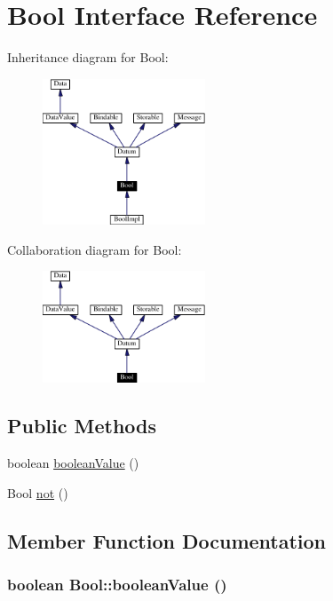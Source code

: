 \hypertarget{interfaceBool}{
\section{Bool  Interface Reference}
\label{interfaceBool}
}
Inheritance diagram for Bool:\begin{figure}[H]
\begin{center}
\leavevmode
\includegraphics[width=137pt]{interfaceBool__inherit__graph}
\end{center}
\end{figure}
Collaboration diagram for Bool:\begin{figure}[H]
\begin{center}
\leavevmode
\includegraphics[width=137pt]{interfaceBool__coll__graph}
\end{center}
\end{figure}
\subsection*{Public Methods}
\begin{CompactItemize}
\item 
boolean \hyperlink{interfaceBool_a0}{boolean\-Value} ()
\item 
Bool \hyperlink{interfaceBool_a1}{not} ()
\end{CompactItemize}


\subsection{Member Function Documentation}
\hypertarget{interfaceBool_a0}{
\subsubsection[booleanValue]{\setlength{\rightskip}{0pt plus 5cm}boolean Bool::boolean\-Value ()}}
\label{interfaceBool_a0}




